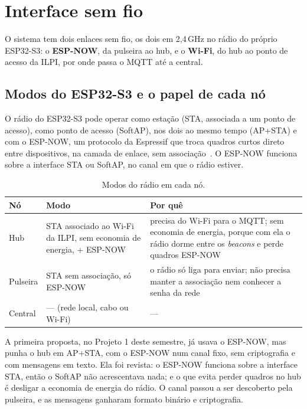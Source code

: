 \section{Interface sem fio}\label{sec:semfio}
O sistema tem dois enlaces sem fio, os dois em 2,4\,GHz no rádio do próprio ESP32-S3: o
\textbf{ESP-NOW}, da pulseira ao hub, e o \textbf{Wi-Fi}, do hub ao ponto de acesso da
ILPI, por onde passa o MQTT até a central.

\subsection{Modos do ESP32-S3 e o papel de cada nó}\label{sec:modos}

O rádio do ESP32-S3 pode operar como estação (STA, associada a um ponto de acesso), como
ponto de acesso (SoftAP), nos dois ao mesmo tempo (AP+STA) e com o ESP-NOW, um protocolo da
Espressif que troca quadros curtos direto entre dispositivos, na camada de enlace, sem
associação~\cite{espnow}. O ESP-NOW funciona sobre a interface STA ou SoftAP, no canal em que
o rádio estiver.

\begin{table}[H]
\centering
\caption{Modos do rádio em cada nó.}
\label{tab:modos}
\small
\begin{tabular}{@{}l>{\raggedright\arraybackslash}p{4.0cm}>{\raggedright\arraybackslash}p{7.8cm}@{}}
\toprule
Nó & Modo & Por quê \\
\midrule
Hub & STA associado ao Wi-Fi da ILPI, sem economia de energia, + ESP-NOW & precisa do Wi-Fi para o MQTT; sem economia de energia, porque com ela o rádio dorme entre os \textit{beacons} e perde quadros ESP-NOW \\
Pulseira & STA sem associação, só ESP-NOW & o rádio só liga para enviar; não precisa manter a associação nem conhecer a senha da rede \\
Central & --- (rede local, cabo ou Wi-Fi) & --- \\
\bottomrule
\end{tabular}
\end{table}

A primeira proposta, no Projeto 1 deste semestre, já usava o ESP-NOW, mas punha o hub em
AP+STA, com o ESP-NOW num canal fixo, sem criptografia e com mensagens em texto. Ela foi
revista: o ESP-NOW funciona sobre a interface STA, então o SoftAP não acrescentava nada; e o
que evita perder quadros no hub é desligar a economia de energia do rádio. O canal passou a
ser descoberto pela pulseira, e as mensagens ganharam formato binário e criptografia.

